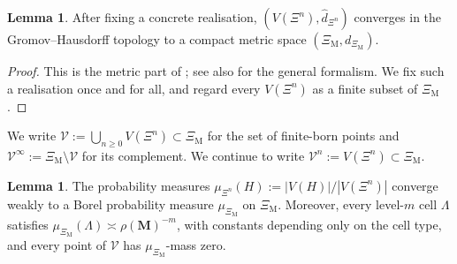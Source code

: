 \documentclass{article}
\theoremstyle{plain}
\theoremstyle{definition}
\newtheorem{lemma}[theorem]{Lemma}
\begin{document}
\begin{lemma}\label{lem:GH_limit_metric}
After fixing a concrete realisation, $(V(\Xi^n),\hat d_{\Xi^n})$ converges in the Gromov--Hausdorff topology to a compact metric space $(\Xi_{\mathrm M},d_{\Xi_{\mathrm M}})$.
\end{lemma}

\begin{proof}
This is the metric part of \cite{neroli2024fractal}; see also \cite{burago2001course,abraham2013note} for the general formalism.
We fix such a realisation once and for all, and regard every $V(\Xi^n)$ as a finite subset of $\Xi_{\mathrm M}$.
\end{proof}

We write $\mathscr V:=\bigcup_{n\ge 0}V(\Xi^n)\subset \Xi_{\mathrm M}$ for the set of finite-born points and $\mathscr V^\infty:=\Xi_{\mathrm M}\setminus \mathscr V$ for its complement.
We continue to write $\mathscr V^n:=V(\Xi^n)\subset \Xi_{\mathrm M}$.

\begin{lemma}\label{lem:GHP_convergence}
The probability measures $\mu_{\Xi^n}(H):=|V(H)|/|V(\Xi^n)|$ converge weakly to a Borel probability measure $\mu_{\Xi_{\mathrm M}}$ on $\Xi_{\mathrm M}$.
Moreover, every level-$m$ cell $\Lambda$ satisfies $\mu_{\Xi_{\mathrm M}}(\Lambda)\asymp \rho(\mathbf M)^{-m}$, with constants depending only on the cell type, and every point of $\mathscr V$ has $\mu_{\Xi_{\mathrm M}}$-mass zero.
\end{lemma}
\end{document}
